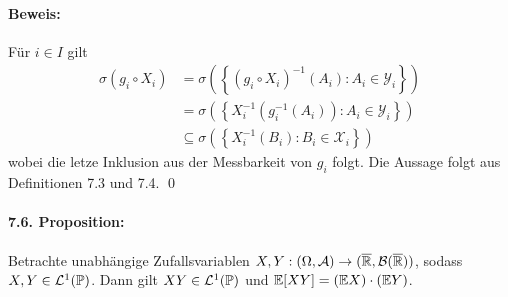 \documentclass[12pt]{report}
\begin{document}
\paragraph{Beweis:}F\"ur $i\in I$ gilt
\begin{align*}
    \sigma(g_i\circ X_i)&=\sigma\left(\left\{(g_i\circ X_i)^{-1}(A_i):A_i\in\mathcal{Y}_i\right\}\right)\\
    &=\sigma\left(\left\{X_i^{-1}\left(g_i^{-1}(A_i)\right):A_i\in\mathcal{Y}_i\right\}\right)\\
    &\subseteq\sigma\left(\left\{X_i^{-1}\left(B_i\right):B_i\in\mathcal{X}_i\right\}\right)
\end{align*}
wobei die letze Inklusion aus der Messbarkeit von $g_i$ folgt. Die Aussage folgt aus Definitionen 7.3 und 7.4. \qed

\paragraph{7.6. Proposition:}Betrachte unabh\"angige Zufallsvariablen $X,Y:(\Omega,\mathcal{A})\to(\overline{\mathbb{R}},\mathcal{B}(\overline{\mathbb{R}}))$, sodass $X,Y\in\mathcal{L}^1(\mathbb{P})$. Dann gilt $XY\in\mathcal{L}^1(\mathbb{P})$ und $\mathbb{E}[XY]=(\mathbb{E} X)\cdot (\mathbb{E} Y)$.
\end{document}
